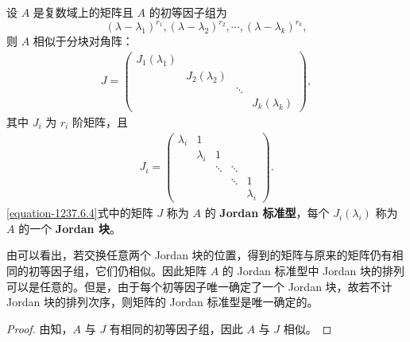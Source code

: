 \documentclass[../../main.tex]{subfiles}
\begin{document}
\begin{theorem}[Jordan标准型]\label{theorem:Jordan标准型}
设 $A$ 是复数域上的矩阵且 $A$ 的初等因子组为
\[
(\lambda - \lambda_1)^{r_1}, (\lambda - \lambda_2)^{r_2}, \cdots, (\lambda - \lambda_k)^{r_k},
\]
则 $A$ 相似于分块对角阵：
\begin{align}
J = \begin{pmatrix}
J_1(\lambda_1) & & & \\
& J_2(\lambda_2) & & \\
& & \ddots & \\
& & & J_k(\lambda_k)
\end{pmatrix},
\label{equation-1237.6.4}
\end{align}
其中 $J_i$ 为 $r_i$ 阶矩阵，且
\begin{align*}
J_i = \begin{pmatrix}
\lambda_i & 1 & & & \\
& \lambda_i & 1 & & \\
& & \ddots & \ddots & \\
& & & \ddots & 1 \\
& & & & \lambda_i
\end{pmatrix}.
\end{align*}
\eqref{equation-1237.6.4}式中的矩阵 $J$ 称为 $A$ 的\textbf{ Jordan 标准型}，每个 $J_i(\lambda_i)$ 称为 $A$ 的一个 \textbf{ Jordan 块}。 
\end{theorem}
\begin{remark}
由可以看出，若交换任意两个 Jordan 块的位置，得到的矩阵与原来的矩阵仍有相同的初等因子组，它们仍相似。因此矩阵 $A$ 的 Jordan 标准型中 Jordan 块的排列可以是任意的。但是，由于每个初等因子唯一确定了一个 Jordan 块，故若不计 Jordan 块的排列次序，则矩阵的 Jordan 标准型是唯一确定的。 
\end{remark}
\begin{proof}
由知，$A$ 与 $J$ 有相同的初等因子组，因此 $A$ 与 $J$ 相似。
\end{proof}
\end{document}
